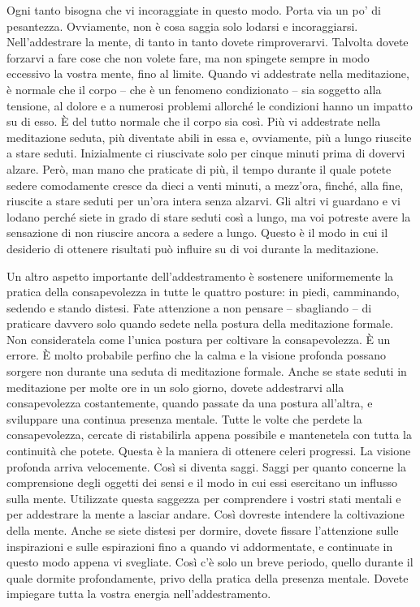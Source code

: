 Ogni tanto bisogna che vi incoraggiate in questo modo. Porta via un po'
di pesantezza. Ovviamente, non è cosa saggia solo lodarsi e
incoraggiarsi. Nell'addestrare la mente, di tanto in tanto dovete
rimproverarvi. Talvolta dovete forzarvi a fare cose che non volete fare,
ma non spingete sempre in modo eccessivo la vostra mente, fino al
limite. Quando vi addestrate nella meditazione, è normale che il corpo
-- che è un fenomeno condizionato -- sia soggetto alla tensione, al
dolore e a numerosi problemi allorché le condizioni hanno un impatto su
di esso. È del tutto normale che il corpo sia così. Più vi addestrate
nella meditazione seduta, più diventate abili in essa e, ovviamente, più
a lungo riuscite a stare seduti. Inizialmente ci riuscivate solo per
cinque minuti prima di dovervi alzare. Però, man mano che praticate di
più, il tempo durante il quale potete sedere comodamente cresce da dieci
a venti minuti, a mezz'ora, finché, alla fine, riuscite a stare seduti
per un'ora intera senza alzarvi. Gli altri vi guardano e vi lodano
perché siete in grado di stare seduti così a lungo, ma voi potreste
avere la sensazione di non riuscire ancora a sedere a lungo. Questo è il
modo in cui il desiderio di ottenere risultati può influire su di voi
durante la meditazione.

Un altro aspetto importante dell'addestramento è sostenere uniformemente
la pratica della consapevolezza in tutte le quattro posture: in piedi,
camminando, sedendo e stando distesi. Fate attenzione a non pensare --
sbagliando -- di praticare davvero solo quando sedete nella postura
della meditazione formale. Non consideratela come l'unica postura per
coltivare la consapevolezza. È un errore. È molto probabile perfino che
la calma e la visione profonda possano sorgere non durante una seduta di
meditazione formale. Anche se state seduti in meditazione per molte ore
in un solo giorno, dovete addestrarvi alla consapevolezza costantemente,
quando passate da una postura all'altra, e sviluppare una continua
presenza mentale. Tutte le volte che perdete la consapevolezza, cercate
di ristabilirla appena possibile e mantenetela con tutta la continuità
che potete. Questa è la maniera di ottenere celeri progressi. La visione
profonda arriva velocemente. Così si diventa saggi. Saggi per quanto
concerne la comprensione degli oggetti dei sensi e il modo in cui essi
esercitano un influsso sulla mente. Utilizzate questa saggezza per
comprendere i vostri stati mentali e per addestrare la mente a lasciar
andare. Così dovreste intendere la coltivazione della mente. Anche se
siete distesi per dormire, dovete fissare l'attenzione sulle
inspirazioni e sulle espirazioni fino a quando vi addormentate, e
continuate in questo modo appena vi svegliate. Così c'è solo un breve
periodo, quello durante il quale dormite profondamente, privo della
pratica della presenza mentale. Dovete impiegare tutta la vostra energia
nell'addestramento.

